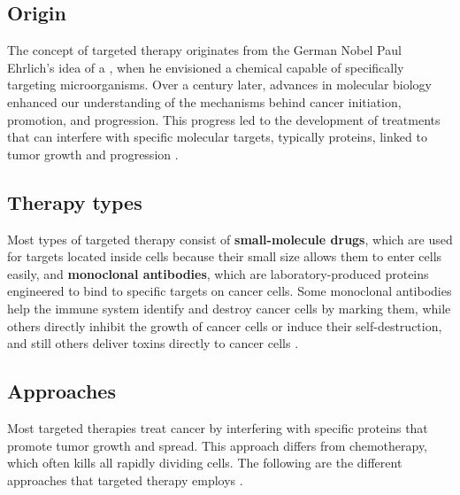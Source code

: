 \subsection{Origin}

The concept of targeted therapy originates from the German Nobel Paul Ehrlich's idea of a  \cite{ehrlich}, when he envisioned a chemical capable of specifically targeting microorganisms. Over a century later, advances in molecular biology enhanced our understanding of the mechanisms behind cancer initiation, promotion, and progression. This progress led to the development of treatments that can interfere with specific molecular targets, typically proteins, linked to tumor growth and progression \cite{se_tt}.

\subsection{Therapy types}

Most types of targeted therapy consist of \textbf{small-molecule drugs}, which are used for targets located inside cells because their small size allows them to enter cells easily, and \textbf{monoclonal antibodies}, which are laboratory-produced proteins engineered to bind to specific targets on cancer cells. Some monoclonal antibodies help the immune system identify and destroy cancer cells by marking them, while others directly inhibit the growth of cancer cells or induce their self-destruction, and still others deliver toxins directly to cancer cells \cite{target_therapy1}. 

\subsection{Approaches}

Most targeted therapies treat cancer by interfering with specific proteins that promote tumor growth and spread. This approach differs from chemotherapy, which often kills all rapidly dividing cells. The following are the different approaches that targeted therapy employs \cite{target_therapy1}.

